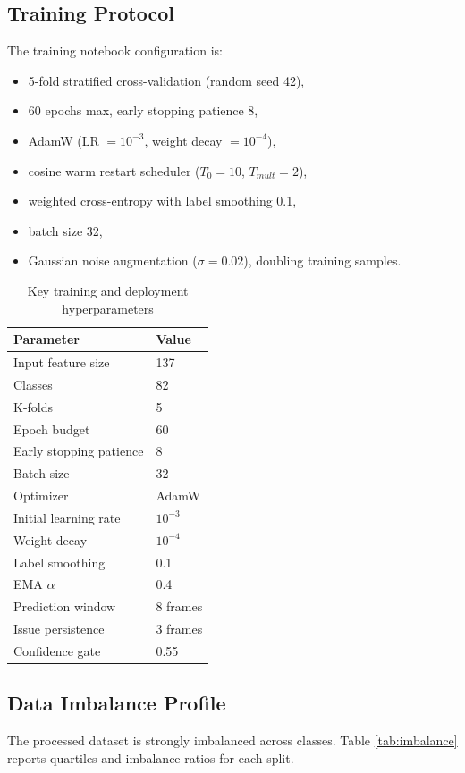 \documentclass[conference]{IEEEtran}
\begin{document}
\subsection{Training Protocol}
The training notebook configuration is:
\begin{itemize}
\item 5-fold stratified cross-validation (random seed 42),
\item 60 epochs max, early stopping patience 8,
\item AdamW (LR $=10^{-3}$, weight decay $=10^{-4}$),
\item cosine warm restart scheduler ($T_0=10$, $T_{mult}=2$),
\item weighted cross-entropy with label smoothing 0.1,
\item batch size 32,
\item Gaussian noise augmentation ($\sigma=0.02$), doubling training samples.
\end{itemize}

\begin{table}[t]
\caption{Key training and deployment hyperparameters}
\label{tab:hyperparams}
\centering
\begin{tabular}{ll}
\toprule
Parameter & Value \\
\midrule
Input feature size & 137 \\
Classes & 82 \\
K-folds & 5 \\
Epoch budget & 60 \\
Early stopping patience & 8 \\
Batch size & 32 \\
Optimizer & AdamW \\
Initial learning rate & $10^{-3}$ \\
Weight decay & $10^{-4}$ \\
Label smoothing & 0.1 \\
EMA $\alpha$ & 0.4 \\
Prediction window & 8 frames \\
Issue persistence & 3 frames \\
Confidence gate & 0.55 \\
\bottomrule
\end{tabular}
\end{table}

\subsection{Data Imbalance Profile}
The processed dataset is strongly imbalanced across classes. Table \ref{tab:imbalance} reports quartiles and imbalance ratios for each split.
\end{document}
